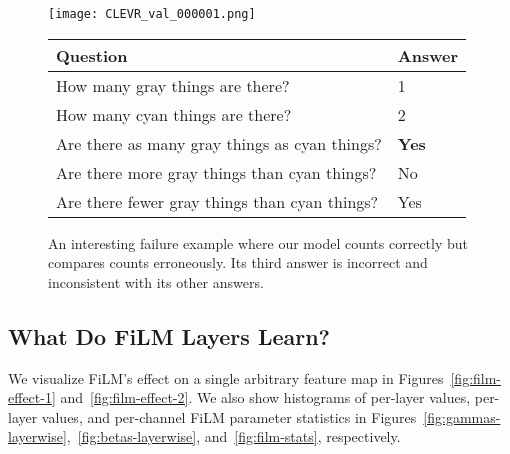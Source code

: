 \documentclass[letterpaper]{article} \usepackage{aaai18}  \usepackage{times}  \usepackage{helvet}  \usepackage{courier}  \usepackage{url}  \usepackage{graphicx}  \frenchspacing  \setlength{\pdfpagewidth}{8.5in}  \setlength{\pdfpageheight}{11in}
\begin{document}
\begin{figure}[th!]
    \centering
    \texttt{[image: CLEVR\_val\_000001.png]}
    \scriptsize
    \begin{tabular}{|l|l|}
    \hline
    Question & Answer\\
    \hline
    How many gray things are there? & 1\\
    How many cyan things are there? & 2\\
    Are there as many gray things as cyan things? & \bf{Yes}\\
    Are there more gray things than cyan things? & No\\
    Are there fewer gray things than cyan things? & Yes\\
    \hline
    \end{tabular}
    \caption{An interesting failure example where our model counts correctly but compares counts erroneously. Its third answer is incorrect and inconsistent with its other answers.}
    \label{fig:logic-error}
\end{figure}

\subsection{What Do FiLM Layers Learn?} \label{appendix-what-is-learned}
	We visualize FiLM's effect on a single arbitrary feature map in Figures~\ref{fig:film-effect-1} and~\ref{fig:film-effect-2}. We also show histograms of per-layer  values, per-layer  values, and per-channel FiLM parameter statistics in Figures~\ref{fig:gammas-layerwise},~\ref{fig:betas-layerwise}, and~\ref{fig:film-stats}, respectively.
\end{document}
